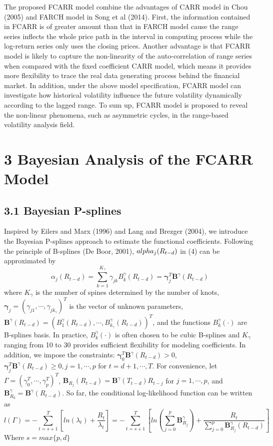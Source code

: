 \documentclass[
journal=jacsat, %
manuscript=article]{achemso}
\begin{document}
\begin{CJK*}{UTF8}{song}
The proposed FCARR model combine the advantages of CARR model in Chou (2005) and FARCH model in Song et al (2014). First, the information contained in FCARR is of greater amount than that in FARCH model cause the range series inflects the whole price path in the interval in computing process while the log-return series only uses the closing prices. Another advantage is that FCARR model is likely to capture the non-linearity of the auto-correlation of range series when compared with the fixed coefficient CARR model, which means it provides more flexibility to trace the real data generating process behind the financial market. In addition, under the above model specification, FCARR model can investigate how historical volatility influence the future volatility dynamically according to the lagged range. To sum up, FCARR model is proposed to reveal the non-linear phenomena, such as asymmetric cycles, in the range-based volatility analysis field.

\section{3 Bayesian Analysis of the FCARR Model}
\subsection{3.1 Bayesian P-splines}
Inspired by Eilers and Marx (1996) and Lang and Brezger (2004), we introduce the Bayesian P-splines approach to estimate the functional coefficients. Following the principle of B-splines (De Boor, 2001), $\\alpha_j(R_{t-d})$ in (4) can be approximated by
\begin{equation}
	 \alpha_j(R_{t-d}) = \sum_{k=1}^{K_\gamma}\gamma_{jk}B_k^\gamma(R_{t-d})=\bm{\gamma}_j^T \mathbf{B}^ \gamma(R_{t-d})
\end{equation}	
where $K_{\gamma}$ is the number of spines determined by the number of knots, $\bm{\gamma}_j = (\gamma_{j1},\cdots,\gamma_{jk_{\gamma}})^T$ is the vector of unknown parameters, $\bm{B}^{\gamma}(R_{t-d}) = (B_1^{\gamma}(R_{t-d}), \cdots, B_{k_{\gamma}}^{\gamma}(R_{t-d}))^T$, and the functions $B_k^{\gamma}(\cdot)$ are B-splines basis. In practice, $B_k^{\gamma}(\cdot)$ is often chosen to be cubic B-splines and $K_{\gamma}$ ranging from 10 to 30 provides sufficient flexibility for modeling coefficients. In addition, we impose the constraints: $\bm{\gamma}_0^T \bm{B}^{\gamma}(R_{t-d}) > 0$, $\bm{\gamma}_j^T \bm{B}^{\gamma}(R_{t-d}) \geq 0 , j=1, \cdots , p$ for $t = d+1, \cdots, T$.
For convenience, let $\Gamma = (\gamma_0^T, \cdots ,\gamma_p^T)^T$, $\bm{B}_{R_j}(R_{t-d})=\bm{B}^{\gamma}(T_{t-d})R_{t-j}$ for $j=1, \cdots, p$, and $\bm{B}_{R_0}^{\gamma}=\bm{B}^{\gamma}(R_{t-d})$. So far, the conditional log-likelihood function can be written as
\begin{equation}
	 l(\Gamma) = -\sum_{t=s+1}^{T} [ln(\lambda_t) + \frac{R_t}{\lambda_t}] = -\sum_{t=s+1}^{T}[ln(\sum_{j=0}^{p}\bm{B}_{R_j}^\gamma) + \frac{R_t}{\sum_{j=0}^p \bm{B}_{R_j}^\gamma (R_{t-d})}]
\end{equation}
Where  $s=max\{p,d\}$


\end{CJK*}
\end{document}

